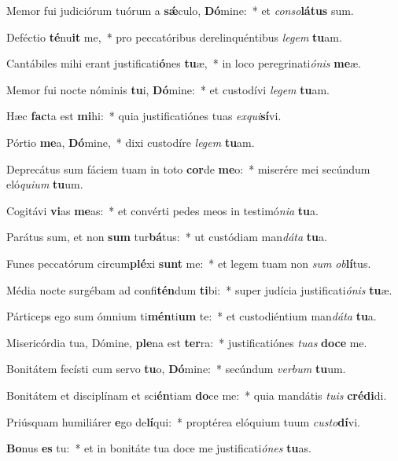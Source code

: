\item Memor fui judiciórum tuórum a \textbf{sǽ}culo, \textbf{Dó}mine:~* et \textit{con}\textit{so}\textbf{lá}\textbf{tus} sum.
\item Deféctio \textbf{té}nu\textbf{it} me,~* pro peccatóribus derelinquéntibus \textit{le}\textit{gem} \textbf{tu}am.
\item Cantábiles mihi erant justificati\textbf{ó}nes \textbf{tu}æ,~* in loco peregrinati\textit{ó}\textit{nis} \textbf{me}æ.
\item Memor fui nocte nóminis \textbf{tu}i, \textbf{Dó}mine:~* et custodívi \textit{le}\textit{gem} \textbf{tu}am.
\item Hæc \textbf{fac}ta est \textbf{mi}hi:~* quia justificatiónes tuas \textit{ex}\textit{qui}\textbf{sí}vi.
\item Pórtio \textbf{me}a, \textbf{Dó}mine,~* dixi custodíre \textit{le}\textit{gem} \textbf{tu}am.
\item Deprecátus sum fáciem tuam in toto \textbf{cor}de \textbf{me}o:~* miserére mei secúndum eló\textit{qui}\textit{um} \textbf{tu}um.
\item Cogitávi \textbf{vi}as \textbf{me}as:~* et convérti pedes meos in testimó\textit{ni}\textit{a} \textbf{tu}a.
\item Parátus sum, et non \textbf{sum} tur\textbf{bá}tus:~* ut custódiam man\textit{dá}\textit{ta} \textbf{tu}a.
\item Funes peccatórum circum\textbf{plé}xi \textbf{sunt} me:~* et legem tuam non \textit{sum} \textit{ob}\textbf{lí}tus.
\item Média nocte surgébam ad confi\textbf{tén}dum \textbf{ti}bi:~* super judícia justificati\textit{ó}\textit{nis} \textbf{tu}æ.
\item Párticeps ego sum ómnium ti\textbf{mén}ti\textbf{um} te:~* et custodiéntium man\textit{dá}\textit{ta} \textbf{tu}a.
\item Misericórdia tua, Dómine, \textbf{ple}na est \textbf{ter}ra:~* justificatiónes \textit{tu}\textit{as} \textbf{do}\textbf{ce} me.
\item Bonitátem fecísti cum servo \textbf{tu}o, \textbf{Dó}mine:~* secúndum \textit{ver}\textit{bum} \textbf{tu}um.
\item Bonitátem et disciplínam et sci\textbf{én}tiam \textbf{do}ce me:~* quia mandátis \textit{tu}\textit{is} \textbf{cré}\textbf{di}di.
\item Priúsquam humiliárer \textbf{e}go de\textbf{lí}qui:~* proptérea elóquium tuum \textit{cus}\textit{to}\textbf{dí}vi.
\item \textbf{Bo}nus \textbf{es} tu:~* et in bonitáte tua doce me justificati\textit{ó}\textit{nes} \textbf{tu}as.
